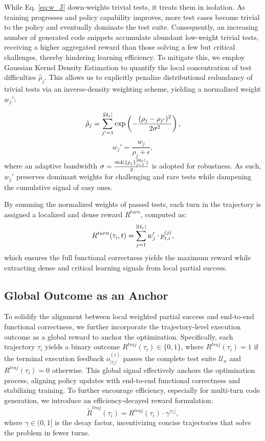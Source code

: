 \documentclass[11pt]{article}
\begin{document}
While Eq. \ref{eq:w_J} down-weights trivial tests, it treats them in isolation. As training progresses and policy capability improves, more test cases become trivial to the policy and eventually dominate the test suite. Consequently, an increasing number of generated code snippets accumulate abundant low-weight trivial tests, receiving a higher aggregated reward than those solving a few but critical challenges, thereby hindering learning efficiency.  To mitigate this, we employ Gaussian Kernel Density Estimation to quantify the local concentration of test difficulties $\hat{\rho}_j$. This allows us to explicitly penalize distributional redundancy of trivial tests via an inverse-density weighting scheme, yielding a normalized weight $w_j'$:

\begin{equation}
\hat{\rho}_j = \sum_{j'=1}^{\small{|\mathcal{U}_x|}} \exp\left(-\frac{(\rho_j - \rho_{j'})^2}{2\sigma^2}\right),
\end{equation}
\begin{equation}
w_j' = \frac{w_j}{\hat{\rho}_j + \epsilon},
\end{equation}
where an adaptive bandwidth $\sigma = \frac {\text{std}(\{\rho_j\}_{j=1}^{\small{|\mathcal{U}_x|}})}{2}$ is adopted for robustness. As such, $w_j'$ preserves dominant weights for challenging and rare tests while dampening the cumulative signal of easy ones.

By summing the normalized weights of passed tests, each turn in the trajectory is assigned a localized and dense reward $R^{turn}$, computed as:
\begin{equation}
R^{turn}(\tau_i, t) = \sum_{j=1}^{\small{|\mathcal{U}_x|}} w_j' \cdot p_{t,i}^{(j)},
\label{reward}
\end{equation}
which ensures the full functional correctness yields the maximum reward while extracting dense and critical learning signals from local partial success. 

\subsection{Global Outcome as an Anchor}\label{method:anchor}
To solidify the alignment between local weighted partial success and end-to-end functional correctness, we further incorporate the trajectory-level execution outcome as a global reward to anchor the optimization. 
Specifically, each trajectory $\tau_i$ yields a binary outcome $R^{traj}(\tau_{i}) \in \{0,1\}$, where $R^{traj}(\tau_{i}) = 1$ if the terminal execution feedback $o_{|\tau_i|}^{(i)}$ passes the complete test suite $\mathcal{U}_x$ and $R^{traj}(\tau_{i}) = 0$ otherwise. This global signal effectively anchors the optimization process, aligning policy updates with end-to-end functional correctness and stabilizing training. To further encourage efficiency, especially for multi-turn code generation, we introduce an efficiency-decayed reward formulation:
\begin{equation}
\tilde{R}^{traj}(\tau_{i}) = R^{traj}(\tau_{i}) \cdot \gamma^{|\tau_{i}|},
\end{equation} 
where $\gamma \in (0,1]$ is the decay factor, incentivizing concise trajectories that solve the problem in fewer turns. 
\end{document}
